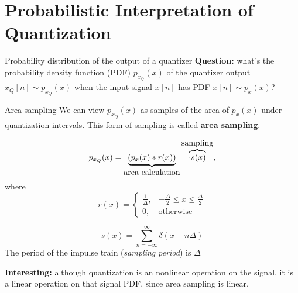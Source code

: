 \section{Probabilistic Interpretation of Quantization}
\begin{frame}{Probability distribution of the output of a quantizer}
\textbf{Question:} what's the probability density function (PDF) $p_{x_Q}(x)$ of the quantizer output $x_Q[n] \sim p_{x_Q}(x)$ when the input signal $x[n]$ has PDF $x[n] \sim p_{x}(x)$?
\begin{center}
	\resizebox{0.75\textwidth}{!}{}
\end{center}

\end{frame}

%
\begin{frame}{Area sampling}
We can view $p_{x_Q}(x)$ as samples of the area of $p_x(x)$ under quantization intervals. This form of sampling is called \textbf{area sampling}.

\begin{equation*}
p_{x_Q}(x) = \underbrace{(p_x(x) \ast r(x))}_{\text{\normalsize area calculation}}\overbrace{\cdot s(x)}^{\text{\normalsize sampling}},
\end{equation*}
where 
\begin{equation*}
r(x) = \begin{cases}
\frac{1}{\Delta}, & -\frac{\Delta}{2} \leq x \leq \frac{\Delta}{2} \\
0, & \text{otherwise}
\end{cases} \tag{rectangular window of area 1}
\end{equation*}

\begin{equation*}
s(x) = \sum_{n = -\infty}^{\infty} \delta(x - n\Delta) \tag{impulse train}
\end{equation*}
The period of the impulse train (\textit{sampling period}) is $\Delta$

\textbf{Interesting:} although quantization is an nonlinear operation on the signal, it is a linear operation on that signal PDF, since area sampling is linear.
\end{frame}

